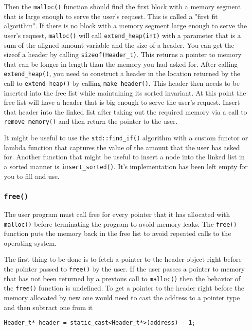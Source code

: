 \documentclass{article}
\begin{document}
Then the \texttt{malloc()} function should find the first block with a memory
segment that is large enough to serve the user's request.  This is called a
"first fit algorithm".  If there is no block with a memory segment large
enough to serve the user's request, \texttt{malloc()} will call
\texttt{extend\_heap(int)} with a parameter that is a sum of the aligned
amount variable and the size of a header.  You can get the sizeof a header by
calling \texttt{sizeof(Header\_t)}.  This returns a pointer to memory that can
be longer in length than the memory you had asked for.  After calling
\texttt{extend\_heap()}, you need to construct a header in the location
returned by the call to \texttt{extend\_heap()} by calling
\texttt{make\_header()}.  This header then needs to be inserted into the free
list while maintaining its sorted invariant.  At this point the free list will
have a header that is big enough to serve the user's request.  Insert that
header into the linked list after taking out the required memory via a call to
\texttt{remove\_memory()} and then return the pointer to the user.

It might be useful to use the \texttt{std::find\_if()} algorithm with a custom
functor or lambda function that captures the value of the amount that the user
has asked for.  Another function that might be useful to insert a node into
the linked list in a sorted manner is \texttt{insert\_sorted()}.  It's
implementation has been left empty for you to fill and use.

\subsubsection{\texttt{free()}}
The user program must call free for every pointer that it has allocated with
\texttt{malloc()} before terminating the program to avoid memory leaks.  The
\texttt{free()} function puts the memory back in the free list to avoid
repeated calls to the operating system.

The first thing to be done is to fetch a pointer to the header object right
before the pointer passed to \texttt{free()} by the user.  If the user passes
a pointer to memory that has not been returned by a previous call to
\texttt{malloc()} then the behavior of the \texttt{free()} function is
undefined.  To get a pointer to the header right before the memory allocated
by new one would need to cast the address to a pointer type and then subtract
one from it

\begin{lstlisting}
Header_t* header = static_cast<Header_t*>(address) - 1;
\end{lstlisting}
\end{document}

